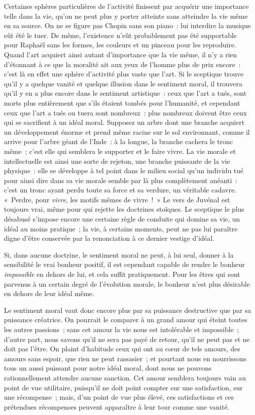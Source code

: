 \documentclass[french,twoside]{book} %
\begin{document}
Certaines sphères particulières de l’activité finissent par acquérir une importance telle dans la vie, qu’on ne peut plus y porter atteinte sans atteindre la vie même en sa source. On ne se figure pas Chopin sans son piano : lui interdire la musique eût été le tuer. De même, l’existence n’eût probablement pas été supportable pour Raphaël sans les formes, les couleurs et un pinceau pour les reproduire. Quand l’art acquiert ainsi autant d’importance que la vie même, il n’y a rien d’étonnant à ce que la moralité ait aux yeux de l’homme plus de prix encore : c’est là en effet une sphère d’activité plus vaste que l’art. Si le sceptique trouve qu’il y a quelque vanité et quelque illusion dans le sentiment moral, il trouvera qu’il y en a plus encore dans le sentiment artistique : ceux que l’art a tués, sont morts plus entièrement que s’ils étaient tombés pour l’humanité, et cependant ceux que l’art a tués ou tuera sont nombreux : plus nombreux doivent être ceux qui se sacrifient à un idéal moral. Supposez un arbre dont une branche acquiert un développement énorme et prend même racine sur le sol environnant, comme il arrive pour l’arbre géant de l’Inde : à la longue, la branche cachera le tronc même ; c’est elle qui semblera le supporter et le faire vivre. La vie morale et intellectuelle est ainsi une sorte de rejeton, une branche puissante de la vie physique : elle se développe à tel point dans le milieu social qu’un individu tué pour ainsi dire dans sa vie morale semble par là plus complètement anéanti : c’est un tronc ayant perdu toute sa force et sa verdure, un véritable cadavre. « Perdre, pour \emph{vivre}, les motifs mêmes de vivre ! » Le vers de Juvénal est toujours vrai, même pour qui rejette les doctrines stoïques. Le sceptique le plus désabusé s’impose encore une certaine règle de conduite qui domine sa vie, un idéal au moins pratique ; la vie, à certains moments, peut ne pas lui paraître digne d’être conservée par la renonciation à ce dernier vestige d’idéal.\par
Si, dans aucune doctrine, le sentiment moral ne peut, à lui seul, donner à la sensibilité le vrai bonheur positif, il est cependant capable de rendre le bonheur \emph{impossible} en dehors de lui, et cela suffit pratiquement. Pour les êtres qui sont parvenus à un certain degré de l’évolution morale, le bonheur n’est plus désirable en dehors de leur idéal même.\par
Le sentiment moral vaut donc encore plus par sa puissance destructive que par sa puissance créatrice. On pourrait le comparer à un grand amour qui éteint toutes les autres passions ; sans cet amour la vie nous est intolérable et impossible ; d’autre part, nous savons qu’il ne sera pas payé de retour, qu’il ne peut pas et ne doit pas l’être. On plaint d’habitude ceux qui ont au cœur de tels amours, des amours sans espoir, que rien ne peut rassasier ; et pourtant nous en nourrissons tous un aussi puissant pour notre idéal moral, dont nous ne pouvons rationnellement attendre aucune sanction. Cet amour semblera toujours vain au point de vue utilitaire, puisqu’il ne doit point compter sur une satisfaction, sur une récompense ; mais, d’un point de vue plus élevé, ces satisfactions et ces prétendues récompenses peuvent apparaître à leur tour comme une vanité.\par
\end{document}
